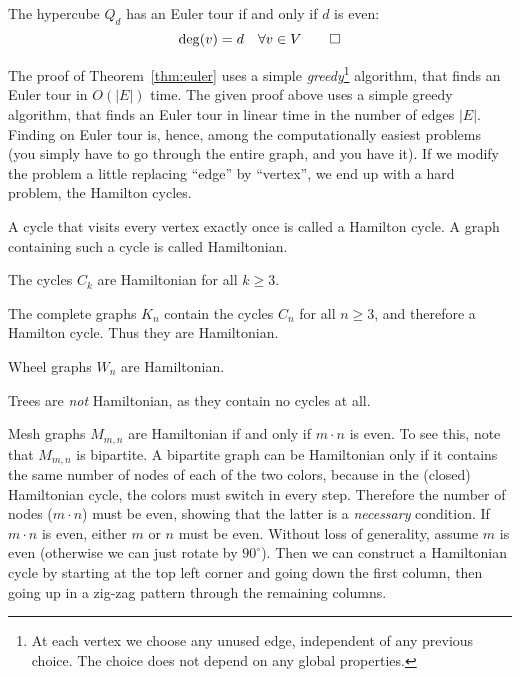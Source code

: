 The hypercube \(Q_d\) has an Euler tour if and only if \(d\) is even:
\[
\deg(v) = d \quad \forall v\in V \qedhere
\]

The proof of Theorem~\ref{thm:euler} uses a simple \emph{greedy}\footnote{
At each vertex we choose any unused edge, independent of any previous choice. The choice does not depend on any global properties.
} algorithm, that finds an Euler tour in \(O(|E|)\) time. The given proof above uses a simple greedy algorithm, that finds an Euler tour in linear time in the number of edges $|E|$. 
Finding on Euler tour is, hence, among the computationally easiest problems (you simply have to go through the entire graph, and you have it). 
If we modify the problem a little replacing ``edge'' by ``vertex'', we end up with a hard problem, the Hamilton cycles.

\begin{definition}\label{def:hamilton-cycle}
A cycle that visits every vertex exactly once is called a Hamilton cycle.
A graph containing such a cycle is called Hamiltonian.
\end{definition}

The cycles $C_k$ are Hamiltonian for all $k \geq 3$.

The complete graphs $K_n$ contain the cycles $C_n$ for all $n \geq 3$, and therefore a Hamilton cycle. 
Thus they are Hamiltonian.

Wheel graphs $W_n$ are Hamiltonian.

Trees are \emph{not} Hamiltonian, as they contain no cycles at all.

Mesh graphs $M_{m,n}$ are Hamiltonian if and only if $m \cdot n$ is even.
To see this, note that $M_{m,n}$ is bipartite.
A bipartite graph can be Hamiltonian only if it contains the same number of nodes of each of the two colors, because in the (closed) Hamiltonian cycle, the colors must switch in every step.
Therefore the number of nodes (\(m \cdot n\)) must be even, showing that the latter is a \emph{necessary} condition.
If \(m \cdot n\) is even, either \(m\) or \(n\) must be even.
Without loss of generality, assume \(m\) is even (otherwise we can just rotate by \(90^\circ\)).
Then we can construct a Hamiltonian cycle by starting at the top left corner and going down the first column, then going up in a zig-zag pattern through the remaining columns.

